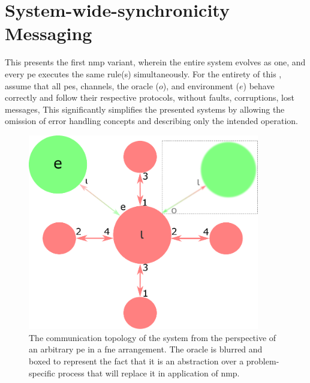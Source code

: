 \section{\label{sec:nmp:systemwide}System-wide-synchronicity Messaging}

\cpresetrulenumber

This  presents the first \gls{nmp} variant, wherein the entire system evolves as one, and every \gls{pe} executes the same rule(s) simultaneously.  For the entirety of this , assume that all \glspl{pe}, channels, the oracle (\(o\)), and environment (\(e\)) behave correctly and follow their respective protocols, without faults, corruptions, lost messages, \etc{}  This significantly simplifies the presented systems by allowing the omission of error handling concepts and describing only the intended operation.

\begin{figure}
    \centering
    \includegraphics[width=0.9\textwidth]{chapters/nmp/images/iota_proxels_environment_oracle_v6.pdf}
    \caption[The communication topology of a  system from the perspective of an arbitrary  in a \gls{fne} arrangement]{The communication topology of the system from the perspective of an arbitrary \gls{pe} in a \gls{fne} arrangement.  The oracle is blurred and boxed to represent the fact that it is an abstraction over a problem-specific process that will replace it in application of \gls{nmp}.}
    \label{fig:nmp:iota_proxels_environment_oracle}
\end{figure}

